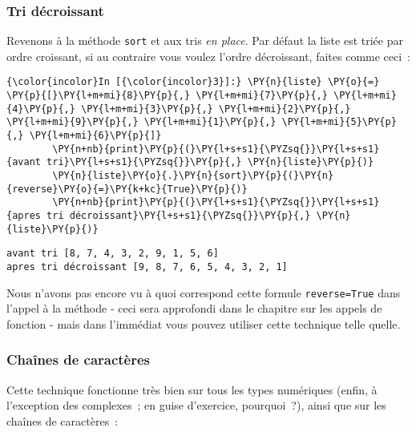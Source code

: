     \hypertarget{tri-duxe9croissant}{%
\subsubsection{Tri décroissant}\label{tri-duxe9croissant}}

    Revenons à la méthode \texttt{sort} et aux tris \emph{en place}. Par
défaut la liste est triée par ordre croissant, si au contraire vous
voulez l'ordre décroissant, faites comme ceci~:

    \begin{Verbatim}[commandchars=\\\{\},frame=single,framerule=0.3mm,rulecolor=\color{cellframecolor}]
{\color{incolor}In [{\color{incolor}3}]:} \PY{n}{liste} \PY{o}{=} \PY{p}{[}\PY{l+m+mi}{8}\PY{p}{,} \PY{l+m+mi}{7}\PY{p}{,} \PY{l+m+mi}{4}\PY{p}{,} \PY{l+m+mi}{3}\PY{p}{,} \PY{l+m+mi}{2}\PY{p}{,} \PY{l+m+mi}{9}\PY{p}{,} \PY{l+m+mi}{1}\PY{p}{,} \PY{l+m+mi}{5}\PY{p}{,} \PY{l+m+mi}{6}\PY{p}{]}
        \PY{n+nb}{print}\PY{p}{(}\PY{l+s+s1}{\PYZsq{}}\PY{l+s+s1}{avant tri}\PY{l+s+s1}{\PYZsq{}}\PY{p}{,} \PY{n}{liste}\PY{p}{)}
        \PY{n}{liste}\PY{o}{.}\PY{n}{sort}\PY{p}{(}\PY{n}{reverse}\PY{o}{=}\PY{k+kc}{True}\PY{p}{)}
        \PY{n+nb}{print}\PY{p}{(}\PY{l+s+s1}{\PYZsq{}}\PY{l+s+s1}{apres tri décroissant}\PY{l+s+s1}{\PYZsq{}}\PY{p}{,} \PY{n}{liste}\PY{p}{)}
\end{Verbatim}


    \begin{Verbatim}[commandchars=\\\{\},frame=single,framerule=0.3mm,rulecolor=\color{cellframecolor}]
avant tri [8, 7, 4, 3, 2, 9, 1, 5, 6]
apres tri décroissant [9, 8, 7, 6, 5, 4, 3, 2, 1]
\end{Verbatim}

    Nous n'avons pas encore vu à quoi correspond cette formule
\texttt{reverse=True} dans l'appel à la méthode - ceci sera approfondi
dans le chapitre sur les appels de fonction - mais dans l'immédiat vous
pouvez utiliser cette technique telle quelle.

    \hypertarget{chauxeenes-de-caractuxe8res}{%
\subsubsection{Chaînes de
caractères}\label{chauxeenes-de-caractuxe8res}}

    Cette technique fonctionne très bien sur tous les types numériques
(enfin, à l'exception des complexes~; en guise d'exercice, pourquoi~?),
ainsi que sur les chaînes de caractères~:

